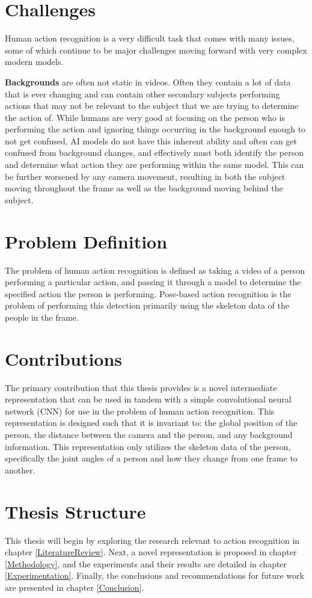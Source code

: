 \section{Challenges}
\label{sec:challenges}

Human action recognition is a very difficult task that comes with many issues, some of which continue to be major challenges moving forward with very complex modern models.

\textbf{Backgrounds} are often not static in videos. Often they contain a lot of data that is ever changing and can contain other secondary subjects performing actions that may not be relevant to the subject that we are trying to determine the action of. While humans are very good at focusing on the person who is performing the action and ignoring things occurring in the background enough to not get confused, AI models do not have this inherent ability and often can get confused from background changes, and effectively must both identify the person and determine what action they are performing within the same model. This can be further worsened by any camera movement, resulting in both the subject moving throughout the frame as well as the background moving behind the subject.

\section{Problem Definition}

The problem of human action recognition is defined as taking a video of a person performing a particular action, and passing it through a model to determine the specified action the person is performing. Pose-based action recognition is the problem of performing this detection primarily using the skeleton data of the people in the frame.

\section{Contributions}

The primary contribution that this thesis provides is a novel intermediate representation that can be used in tandem with a simple convolutional neural network (CNN) for use in the problem of human action recognition. This representation is designed such that it is invariant to: the global position of the person, the distance between the camera and the person, and any background information. This representation only utilizes the skeleton data of the person, specifically the joint angles of a person and how they change from one frame to another.

\section{Thesis Structure}

This thesis will begin by exploring the research relevant to action recognition in chapter \ref{LiteratureReview}. Next, a novel representation is proposed in chapter \ref{Methodology}, and the experiments and their results are detailed in chapter \ref{Experimentation}. Finally, the conclusions and recommendations for future work are presented in chapter \ref{Conclusion}.